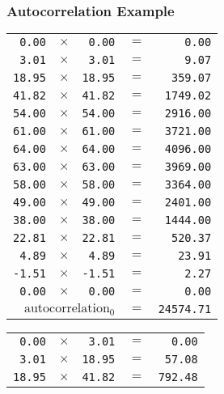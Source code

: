 \subsubsection{Autocorrelation Example}
{
\begin{multicols}{2}
\begin{tabular}{rrrrr}
  \texttt{0.00} & $\times$ & \texttt{0.00} & $=$ & \texttt{0.00} \\
  \texttt{3.01} & $\times$ & \texttt{3.01} & $=$ & \texttt{9.07} \\
  \texttt{18.95} & $\times$ & \texttt{18.95} & $=$ & \texttt{359.07} \\
  \texttt{41.82} & $\times$ & \texttt{41.82} & $=$ & \texttt{1749.02} \\
  \texttt{54.00} & $\times$ & \texttt{54.00} & $=$ & \texttt{2916.00} \\
  \texttt{61.00} & $\times$ & \texttt{61.00} & $=$ & \texttt{3721.00} \\
  \texttt{64.00} & $\times$ & \texttt{64.00} & $=$ & \texttt{4096.00} \\
  \texttt{63.00} & $\times$ & \texttt{63.00} & $=$ & \texttt{3969.00} \\
  \texttt{58.00} & $\times$ & \texttt{58.00} & $=$ & \texttt{3364.00} \\
  \texttt{49.00} & $\times$ & \texttt{49.00} & $=$ & \texttt{2401.00} \\
  \texttt{38.00} & $\times$ & \texttt{38.00} & $=$ & \texttt{1444.00} \\
  \texttt{22.81} & $\times$ & \texttt{22.81} & $=$ & \texttt{520.37} \\
  \texttt{4.89} & $\times$ & \texttt{4.89} & $=$ & \texttt{23.91} \\
  \texttt{-1.51} & $\times$ & \texttt{-1.51} & $=$ & \texttt{2.27} \\
  \texttt{0.00} & $\times$ & \texttt{0.00} & $=$ & \texttt{0.00} \\
  \hline
  \multicolumn{3}{r}{$\text{autocorrelation}_0$} & $=$ & \texttt{24574.71} \\
\end{tabular}
\par
\begin{tabular}{rrrrr}
  \texttt{0.00} & $\times$ & \texttt{3.01} & $=$ & \texttt{0.00} \\
  \texttt{3.01} & $\times$ & \texttt{18.95} & $=$ & \texttt{57.08} \\
  \texttt{18.95} & $\times$ & \texttt{41.82} & $=$ & \texttt{792.48} \\

\end{tabular}
\end{multicols}}
